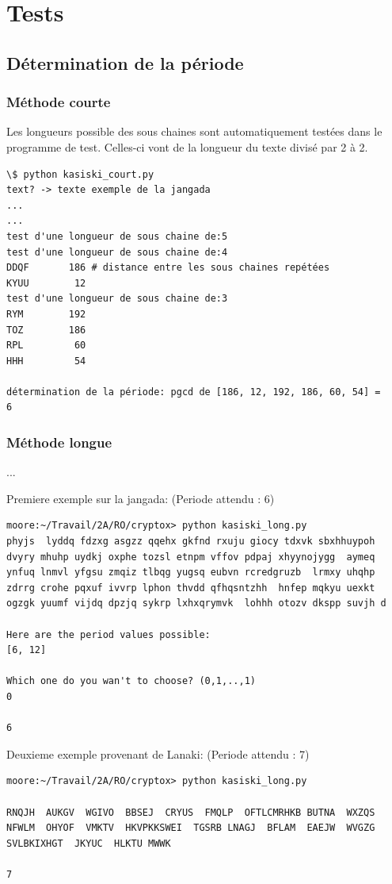 \documentclass[a4paper, 11pt]{article}
\begin{document}
\section{Tests}

\subsection{Détermination de la période}

\subsubsection{Méthode courte}

Les longueurs possible des sous chaines sont automatiquement testées
dans le programme de test.
Celles-ci vont de la longueur du texte divisé par 2 à 2.

\begin{lstlisting}
\$ python kasiski_court.py
text? -> texte exemple de la jangada
...
...
test d'une longueur de sous chaine de:5
test d'une longueur de sous chaine de:4
DDQF       186 # distance entre les sous chaines repétées
KYUU        12
test d'une longueur de sous chaine de:3
RYM        192
TOZ        186
RPL         60
HHH         54

détermination de la période: pgcd de [186, 12, 192, 186, 60, 54] =
6
\end{lstlisting}

\subsubsection{Méthode longue}
...

Premiere exemple sur la jangada: (Periode attendu : 6)
\begin{lstlisting}
moore:~/Travail/2A/RO/cryptox> python kasiski_long.py 
phyjs  lyddq fdzxg asgzz qqehx gkfnd rxuju giocy tdxvk sbxhhuypoh  dvyry mhuhp uydkj oxphe tozsl etnpm vffov pdpaj xhyynojygg  aymeq ynfuq lnmvl yfgsu zmqiz tlbqg yugsq eubvn rcredgruzb  lrmxy uhqhp zdrrg crohe pqxuf ivvrp lphon thvdd qfhqsntzhh  hnfep mqkyu uexkt ogzgk yuumf vijdq dpzjq sykrp lxhxqrymvk  lohhh otozv dkspp suvjh d

Here are the period values possible:
[6, 12]

Which one do you wan't to choose? (0,1,..,1)
0

6
\end{lstlisting}

Deuxieme exemple provenant de Lanaki: (Periode attendu : 7)
\begin{lstlisting}
moore:~/Travail/2A/RO/cryptox> python kasiski_long.py 

RNQJH  AUKGV  WGIVO  BBSEJ  CRYUS  FMQLP  OFTLCMRHKB BUTNA  WXZQS  NFWLM  OHYOF  VMKTV  HKVPKKSWEI  TGSRB LNAGJ  BFLAM  EAEJW  WVGZG  SVLBKIXHGT  JKYUC  HLKTU MWWK

7
\end{lstlisting}
\end{document}
